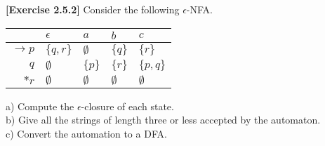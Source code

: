 \textbf{[Exercise 2.5.2]} Consider the following $\epsilon$-NFA.
\begin{center}
    \begin{tabular}{r||l|l|l|l}
        & $\epsilon$ & $a$ & $b$ & $c$\\ \hline \hline
        $\rightarrow p$ & $\{q,r\}$ &$\emptyset$ & $\{q\}$ & $\{r\}$\\
        $q$ & $\emptyset$ &$\{p\}$ & $\{r\}$ & $\{p,q\}$\\
        $*r$ & $\emptyset$ &$\emptyset$ & $\emptyset$ & $\emptyset$\\    
    \end{tabular}
\end{center}
a) Compute the $\epsilon$-closure of each state.\\
b) Give all the strings of length three or less accepted by the automaton.\\
c) Convert the automation to a DFA.

